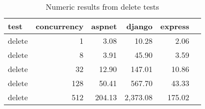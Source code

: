 \FloatBarrier
\begin{table}[!htp]\centering
    \caption{Numeric results from delete tests}\label{tab:resultsDelete}
    \scriptsize
    \begin{tabular}{lrrrrr}\toprule
        test   & concurrency & aspnet & django   & express \\\midrule
delete &1 &3.08 &10.28 &2.06 \\
delete &8 &3.91 &45.90 &3.59 \\
delete &32 &12.90 &147.01 &10.86 \\
delete &128 &50.41 &567.70 &43.33 \\
delete &512 &204.13 &2,373.08 &175.02 \\
        \bottomrule
    \end{tabular}
\end{table}
\FloatBarrier
